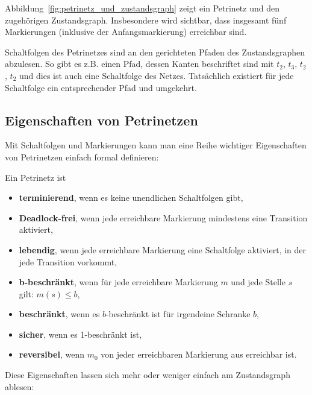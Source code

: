 Abbildung~\ref{fig:petrinetz_und_zustandsgraph} zeigt ein Petrinetz und den zugehörigen Zustandsgraph. Insbesondere wird sichtbar, dass insgesamt fünf Markierungen (inklusive der Anfangsmarkierung) erreichbar sind.

Schaltfolgen des Petrinetzes sind an den gerichteten Pfaden des Zustandsgraphen abzulesen. So gibt es z.B. einen Pfad, dessen Kanten beschriftet sind mit $t_2$, $t_3$, $t_2$, $t_2$ und dies ist auch eine Schaltfolge des Netzes. Tatsächlich existiert für jede Schaltfolge ein entsprechender Pfad und umgekehrt.

\subsection*{Eigenschaften von Petrinetzen}

Mit Schaltfolgen und Markierungen kann man eine Reihe wichtiger Eigenschaften von Petrinetzen einfach formal definieren:

Ein Petrinetz ist

\begin{itemize}
	\item \textbf{terminierend}, wenn es keine unendlichen Schaltfolgen gibt,
	\item \textbf{Deadlock-frei}, wenn jede erreichbare Markierung mindestens eine Transition aktiviert,
	\item \textbf{lebendig}, wenn jede erreichbare Markierung eine Schaltfolge aktiviert, in der jede Transition vorkommt,
	\item \textbf{b-beschränkt}, wenn für jede erreichbare Markierung $m$ und jede Stelle $s$ gilt: $m(s) \leq b$,
	\item \textbf{beschränkt}, wenn es $b$-beschränkt ist für irgendeine Schranke $b$,
	\item \textbf{sicher}, wenn es 1-beschränkt ist,
	\item \textbf{reversibel}, wenn $m_0$ von jeder erreichbaren Markierung aus erreichbar ist.
\end{itemize}


\label{text:zentrale_eigenschaften_zustandsgraph}
Diese Eigenschaften 
lassen sich mehr oder weniger einfach am Zustandsgraph ablesen:

